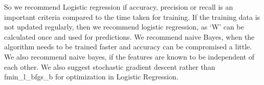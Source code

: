 \documentclass{article}
\begin{document}
So we recommend Logistic regression if accuracy, precision or recall is an important criteria compared to the time taken for training. If the training data is not updated regularly, then we recommend logistic regression, as ‘W’ can be calculated once and used for predictions. We recommend naive Bayes, when the algorithm needs to be trained faster and accuracy can be compromised a little. We also recommend naive bayes, if the features are known to be independent of each other. We also suggest stochastic gradient descent rather than fmin\_l\_bfgs\_b for optimization in Logistic Regression.



\nocite{chameleon}
\nocite{Bryan}
\nocite{python}
\nocite{log}
\nocite{nb}




\end{document}
